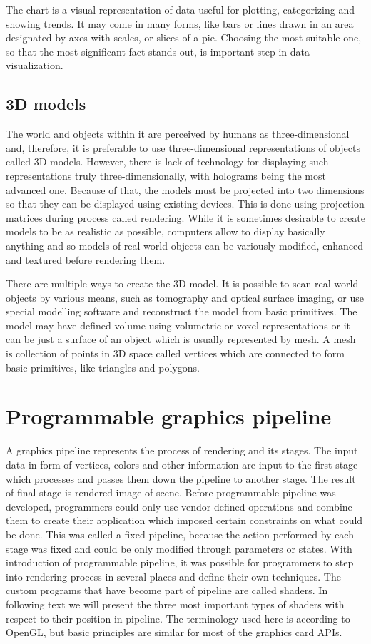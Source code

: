 The chart is a visual representation of data useful for plotting, categorizing
and showing trends. It may come in many forms, like bars or lines drawn in an
area designated by axes with scales, or slices of a pie. Choosing the most
suitable one, so that the most significant fact stands out, is important step in
data visualization.

\subsection{3D models}
The world and objects within it are perceived by humans as three-dimensional
and, therefore, it is preferable to use three-dimensional representations of
objects called 3D models. However, there is lack of technology for displaying
such representations truly three-dimensionally, with holograms being the most
advanced one. Because of that, the models must be projected into two dimensions
so that they can be displayed using existing devices. This is done using
projection matrices during process called rendering. While it is sometimes
desirable to create models to be as realistic as possible, computers allow to
display basically anything and so models of real world objects can be variously
modified, enhanced and textured before rendering them.

There are multiple ways to create the 3D model. It is possible to scan real
world objects by various means, such as tomography and optical surface imaging,
or use special modelling software and reconstruct the model from basic
primitives. The model may have defined volume using volumetric or voxel
representations or it can be just a surface of an object which is usually
represented by mesh. A mesh is collection of points in 3D space called vertices
which are connected to form basic primitives, like triangles and polygons.

\section{Programmable graphics pipeline}
A graphics pipeline represents the process of rendering and its stages. The
input data in form of vertices, colors and other information are input to the
first stage which processes and passes them down the pipeline to another stage.
The result of final stage is rendered image of scene. Before programmable
pipeline was developed, programmers could only use vendor defined operations and
combine them to create their application which imposed certain constraints on
what could be done. This was called a fixed pipeline, because the action
performed by each stage was fixed and could be only modified through parameters
or states. With introduction of programmable pipeline, it was possible for
programmers to step into rendering process in several places and define their
own techniques. The custom programs that have become part of pipeline are called
shaders. In following text we will present the three most important types of
shaders with respect to their position in pipeline. The terminology used here is
according to OpenGL, but basic principles are similar for most of the graphics
card APIs.


